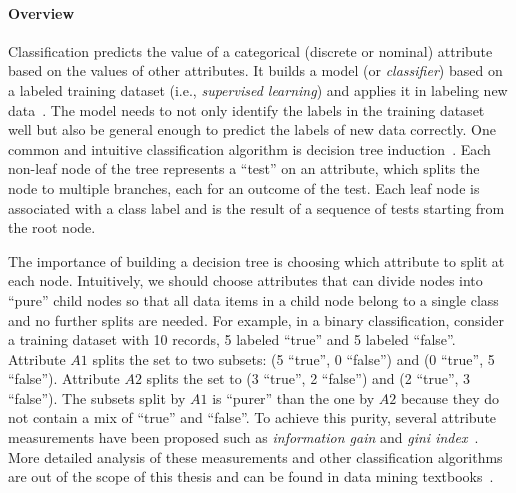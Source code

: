 \paragraph{Overview}
Classification predicts the value of a categorical (discrete or nominal) attribute based on the values of other attributes. It builds a model (or \emph{classifier}) based on a labeled training dataset (i.e., \emph{supervised learning}) and applies it in labeling new data~\cite{Han2011}. The model needs to not only identify the labels in the training dataset well but also be general enough to predict the labels of new data correctly. One common and intuitive classification algorithm is decision tree induction~\cite{Quinlan1986}. Each non-leaf node of the tree represents a ``test'' on an attribute, which splits the node to multiple branches, each for an outcome of the test. Each leaf node is associated with a class label and is the result of a sequence of tests starting from the root node.

The importance of building a decision tree is choosing which attribute to split at each node. Intuitively, we should choose attributes that can divide nodes into ``pure'' child nodes so that all data items in a child node belong to a single class and no further splits are needed. For example, in a binary classification, consider a training dataset with 10 records, 5 labeled ``true'' and 5 labeled ``false''. Attribute $A1$ splits the set to two subsets: (5 ``true'', 0 ``false'') and (0 ``true'', 5 ``false''). Attribute $A2$ splits the set to (3 ``true'', 2 ``false'') and (2 ``true'', 3 ``false''). The subsets split by $A1$ is ``purer'' than the one by $A2$ because they do not contain a mix of ``true'' and ``false''. To achieve this purity, several attribute measurements have been proposed such as \emph{information gain} and \emph{gini index}~\cite{Tan2006}. More detailed analysis of these measurements and other classification algorithms are out of the scope of this thesis and can be found in data mining textbooks~\cite{Tan2006,Han2011}.

